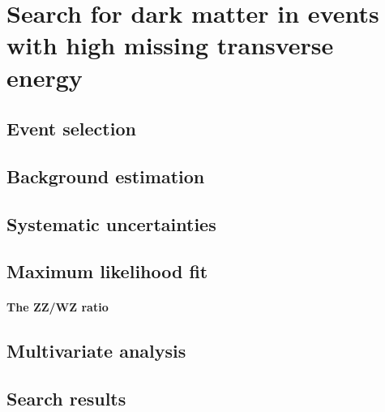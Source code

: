 \chapter{Search for dark matter in events with high missing transverse energy}
\section{Event selection}
\section{Background estimation}
\section{Systematic uncertainties}
\section{Maximum likelihood fit}
\subsubsection{The ZZ/WZ ratio}
\section{Multivariate analysis}
\section{Search results}
